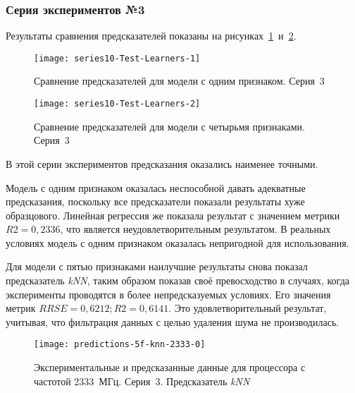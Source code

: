 \subsubsection{Серия экспериментов №3}

Результаты сравнения предсказателей показаны на рисунках~\ref{img:series10-Test-Learners-1}~и~\ref{img:series10-Test-Learners-2}.

\begin{figure}[H]
    \begin{center}
        \texttt{[image: series10-Test-Learners-1]}
        \caption{Сравнение предсказателей для модели с одним признаком. Серия~3} %
        \label{img:series10-Test-Learners-1} %
    \end{center}
\end{figure}

\begin{figure}[H]
    \begin{center}
        \texttt{[image: series10-Test-Learners-2]}
        \caption{Сравнение предсказателей для модели с четырьмя признаками. Серия~3}
        \label{img:series10-Test-Learners-2}
    \end{center}
\end{figure}

В этой серии экспериментов предсказания оказались наименее точными.

Модель с одним признаком оказалась неспособной давать адекватные предсказания, поскольку все предсказатели показали результаты хуже образцового. Линейная регрессия же показала результат с значением метрики $R2 = 0,2336$, что является неудовлетворительным результатом. В реальных условиях модель с одним признаком оказалась непригодной для использования.

Для модели с пятью признаками наилучшие результаты снова показал предсказатель \textit{kNN}, таким образом показав своё превосходство в случаях, когда эксперименты проводятся в более непредсказуемых условиях. Его значения метрик $RRSE = 0,6212; R2 = 0,6141$. Это удовлетворительный результат, учитывая, что фильтрация данных с целью удаления шума не производилась.

\begin{figure}[H]
    \begin{center}
        \texttt{[image: predictions-5f-knn-2333-0]}
        \caption{Экспериментальные и предсказанные данные для процессора с частотой 2333~МГц. Серия~3. Предсказатель \textit{kNN}}
        \label{img:predictions-5f-knn-2333-0}
    \end{center}
\end{figure}

